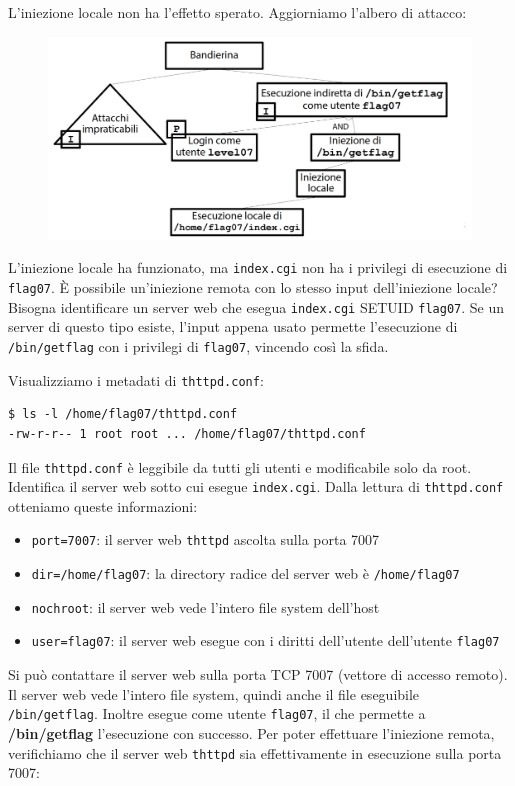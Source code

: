 L'iniezione locale non ha l'effetto sperato. Aggiorniamo l'albero di attacco:

\begin{figure}[hbpt!]
    \centering
    \includegraphics[width=0.8 \textwidth]{./Images/cap6/6.2.png}
\end{figure}
\FloatBarrier

L'iniezione locale ha funzionato, ma \texttt{index.cgi} non ha i privilegi di esecuzione di \texttt{flag07}. È possibile un'iniezione remota con lo stesso input dell'iniezione locale? Bisogna identificare un server web che esegua \texttt{index.cgi} SETUID \texttt{flag07}. Se un server di questo tipo esiste, l'input appena usato permette l'esecuzione di \texttt{/bin/getflag} con i privilegi di \texttt{flag07}, vincendo così la sfida.

Visualizziamo i metadati di \texttt{thttpd.conf}:
\begin{mdframed}[backgroundcolor=white!20,shadow=false]
\begin{lstlisting}
$ ls -l /home/flag07/thttpd.conf
-rw-r-r-- 1 root root ... /home/flag07/thttpd.conf
\end{lstlisting}
\end{mdframed}
Il file \texttt{thttpd.conf} è leggibile da tutti gli utenti e modificabile solo da root. Identifica il server web sotto cui esegue \texttt{index.cgi}. Dalla lettura di \texttt{thttpd.conf} otteniamo queste informazioni:
\begin{itemize}
    \item \texttt{port=7007}: il server web \texttt{thttpd} ascolta sulla porta 7007 
    \item \texttt{dir=/home/flag07}: la directory radice del server web è \texttt{/home/flag07} 
    \item \texttt{nochroot}: il server web vede l'intero file system dell'host
    \item \texttt{user=flag07}: il server web esegue con i diritti dell'utente dell'utente \texttt{flag07}
\end{itemize}
Si può contattare il server web sulla porta TCP 7007 (vettore di accesso remoto). Il server web vede l'intero file system, quindi anche il file eseguibile \texttt{/bin/getflag}. Inoltre esegue come utente \texttt{flag07}, il che permette a \textbf{/bin/getflag} l'esecuzione con successo. Per poter effettuare l'iniezione remota, verifichiamo che il server web \texttt{thttpd} sia effettivamente in esecuzione sulla porta 7007:

